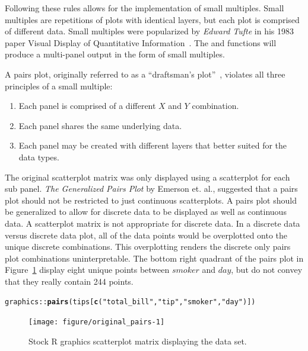 \documentclass[stat,dissertation]{puthesis}\usepackage[]{graphicx}\usepackage{xcolor}
\makeatletter
\newcommand{\hlstr}[1]{\textcolor[rgb]{0.192,0.494,0.8}{#1}}%
\newcommand{\hlopt}[1]{\textcolor[rgb]{0,0,0}{#1}}%
\newcommand{\hlstd}[1]{\textcolor[rgb]{0.345,0.345,0.345}{#1}}%
\newcommand{\hlkwd}[1]{\textcolor[rgb]{0.737,0.353,0.396}{\textbf{#1}}}%
\newenvironment{kframe}{%
 \def\at@end@of@kframe{}%
 \ifinner\ifhmode%
  \def\at@end@of@kframe{\end{minipage}}%
  \begin{minipage}{\columnwidth}%
 \fi\fi%
 \def\FrameCommand##1{\hskip\@totalleftmargin \hskip-\fboxsep
 \colorbox{shadecolor}{##1}\hskip-\fboxsep
     \hskip-\linewidth \hskip-\@totalleftmargin \hskip\columnwidth}%
 \MakeFramed {\advance\hsize-\width
   \@totalleftmargin\z@ \linewidth\hsize
   \@setminipage}}%
 {\par\unskip\endMakeFramed%
 \at@end@of@kframe}
\newenvironment{knitrout}{}{} %
\renewenvironment{knitrout}{\setstretch{1}}{}
\makeatother
\begin{document}
  Following these rules allows for the implementation of small multiples.  Small multiples are repetitions of plots with identical layers, but each plot is comprised of different data.  Small multiples were popularized by \emph{Edward Tufte} in his 1983 paper Visual Display of Quantitative Information~\cite{tufte_display_info}.  The  and  functions will produce a multi-panel output in the form of small multiples.

  A pairs plot, originally referred to as a ``draftsman's plot''~\cite{GraphicalMethods},  violates all three principles of a small multiple:

  \begin{enumerate}
    \item Each panel is comprised of a different $X$ and $Y$ combination.
    \item Each panel shares the same underlying data.
    \item Each panel may be created with different layers that better suited for the data types.
  \end{enumerate}


  The original scatterplot matrix was only displayed using a scatterplot for each sub panel.  \emph{The Generalized Pairs Plot} by Emerson et. al., suggested that a pairs plot should not be restricted to just continuous scatterplots.  A pairs plot should be generalized to allow for discrete data to be displayed as well as continuous data.  A scatterplot matrix is not appropriate for discrete data.  In a discrete data versus discrete data plot, all of the data points would be overplotted onto the unique discrete combinations.  This overplotting renders the discrete only pairs plot combinations uninterpretable.  The bottom right quadrant of the pairs plot in Figure~\ref{fig:original_pairs} display eight unique points between $smoker$ and $day$, but do not convey that they really contain 244 points.

\begin{knitrout}\small
{}\color{fgcolor}\begin{kframe}
\begin{alltt}
\hlstd{graphics}\hlopt{::}\hlkwd{pairs}\hlstd{(tips[}\hlkwd{c}\hlstd{(}\hlstr{"total_bill"}\hlstd{,} \hlstr{"tip"}\hlstd{,} \hlstr{"smoker"}\hlstd{,} \hlstr{"day"}\hlstd{)])}
\end{alltt}
\end{kframe}\begin{figure}[H]

{\centering \texttt{[image: figure/original\_pairs-1]} 

}

\caption{Stock R graphics scatterplot matrix displaying the  data set.}\label{fig:original_pairs}
\end{figure}


\end{knitrout}
\end{document}
